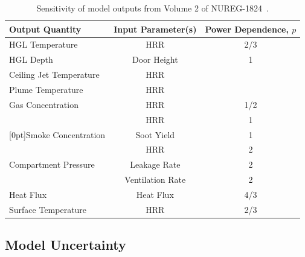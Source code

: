 \begin{table}[t]
\caption{Sensitivity of model outputs from Volume 2 of NUREG-1824~\cite{NUREG_1824}. }
\begin{center}
\begin{tabular}{|l|c|c|}
\hline
Output Quantity                                 & Input Parameter(s)    & Power Dependence, $p$ \\ \hline \hline
HGL Temperature                                 & HRR                   & 2/3    \\ \hline
HGL Depth                                       & Door Height           & 1      \\ \hline
Ceiling Jet Temperature                         & HRR                   &        \\ \hline
Plume Temperature                               & HRR                   &        \\ \hline
Gas Concentration                               & HRR                   & 1/2    \\ \hline
                                                & HRR                   & 1      \\ \cline{2-3}
\raisebox{1.5ex}[0pt]{Smoke Concentration}      & Soot Yield            & 1      \\ \hline
                                                & HRR                   & 2      \\ \cline{2-3}
Compartment Pressure                            & Leakage Rate          & 2      \\ \cline{2-3}
                                                & Ventilation Rate      & 2      \\ \hline
Heat Flux                                       & Heat Flux             & 4/3    \\ \hline
Surface Temperature                             & HRR                   & 2/3    \\ \hline
\end{tabular}
\end{center}
\label{Parameter_Uncertainty}
\end{table}




\subsection{Model Uncertainty}

